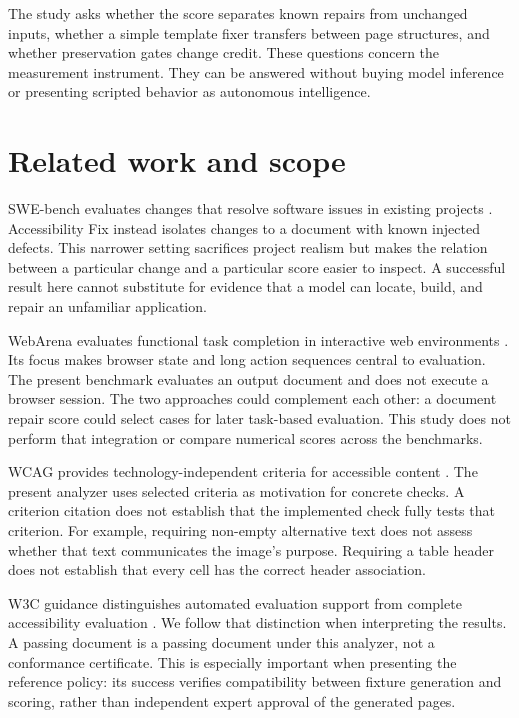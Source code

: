 \documentclass{article}
\begin{document}
The study asks whether the score separates known repairs from unchanged inputs, whether a simple template fixer transfers between page structures, and whether preservation gates change credit. These questions concern the measurement instrument. They can be answered without buying model inference or presenting scripted behavior as autonomous intelligence.


\section{Related work and scope}
SWE-bench evaluates changes that resolve software issues in existing projects \citep{swebench}. Accessibility Fix instead isolates changes to a document with known injected defects. This narrower setting sacrifices project realism but makes the relation between a particular change and a particular score easier to inspect. A successful result here cannot substitute for evidence that a model can locate, build, and repair an unfamiliar application.

WebArena evaluates functional task completion in interactive web environments \citep{webarena}. Its focus makes browser state and long action sequences central to evaluation. The present benchmark evaluates an output document and does not execute a browser session. The two approaches could complement each other: a document repair score could select cases for later task-based evaluation. This study does not perform that integration or compare numerical scores across the benchmarks.

WCAG provides technology-independent criteria for accessible content \citep{wcag}. The present analyzer uses selected criteria as motivation for concrete checks. A criterion citation does not establish that the implemented check fully tests that criterion. For example, requiring non-empty alternative text does not assess whether that text communicates the image's purpose. Requiring a table header does not establish that every cell has the correct header association.

W3C guidance distinguishes automated evaluation support from complete accessibility evaluation \citep{tools}. We follow that distinction when interpreting the results. A passing document is a passing document under this analyzer, not a conformance certificate. This is especially important when presenting the reference policy: its success verifies compatibility between fixture generation and scoring, rather than independent expert approval of the generated pages.
\end{document}
